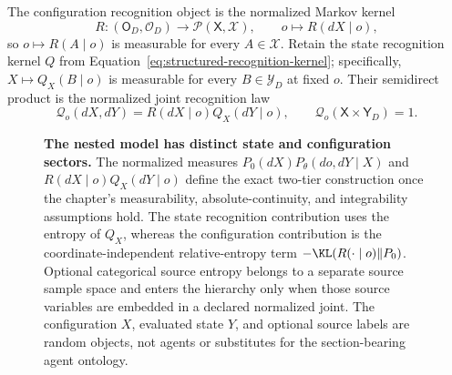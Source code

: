 The configuration recognition object is the normalized Markov kernel
\begin{equation}
R:(\mathsf O_D,\mathscr O_D)
\longrightarrow\mathcal P(\mathsf X,\mathscr X),
\qquad
o\longmapsto R(dX\mid o),
\label{eq:configuration-recognition-kernel}
\end{equation}
so \(o\mapsto R(A\mid o)\) is measurable for every \(A\in\mathscr X\). Retain the state recognition kernel \(Q\) from Equation~\eqref{eq:structured-recognition-kernel}; specifically, \(X\mapsto Q_X(B\mid o)\) is measurable for every \(B\in\mathscr Y_D\) at fixed \(o\). Their semidirect product is the normalized joint recognition law
\begin{equation}
\mathcal Q_o(dX,dY)
=R(dX\mid o)Q_X(dY\mid o),
\qquad
\mathcal Q_o(\mathsf X\times\mathsf Y_D)=1.
\label{eq:hierarchical-recognition-law}
\end{equation}

\begin{figure}[tbp]
\centering
\resizebox{\textwidth}{!}{}
\caption{\textbf{The nested model has distinct state and configuration sectors.} The normalized measures \(P_0(dX)P_\theta(do,dY\mid X)\) and \(R(dX\mid o)Q_X(dY\mid o)\) define the exact two-tier construction once the chapter's measurability, absolute-continuity, and integrability assumptions hold. The state recognition contribution uses the entropy of \(Q_X\), whereas the configuration contribution is the coordinate-independent relative-entropy term \(-\KL(R(\mathord\cdot\mid o)\Vert P_0)\). Optional categorical source entropy belongs to a separate source sample space and enters the hierarchy only when those source variables are embedded in a declared normalized joint. The configuration \(X\), evaluated state \(Y\), and optional source labels are random objects, not agents or substitutes for the section-bearing agent ontology.}
\label{fig:magent-state-configuration-tiers}
\end{figure}


